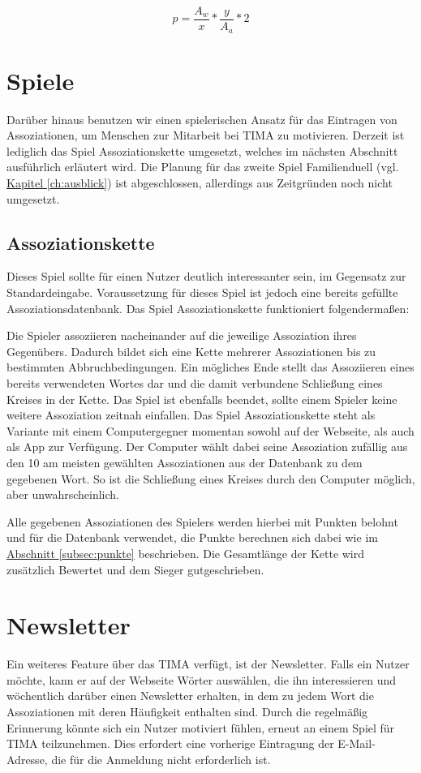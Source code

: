 \begin{equation}\label{eq:score}
p = \frac{A_w}{x} * \frac{y}{A_a} * 2
\end{equation}

\section{Spiele}\label{sec:games}
Darüber hinaus benutzen wir einen spielerischen Ansatz für das Eintragen von Assoziationen, um Menschen zur Mitarbeit bei TIMA zu motivieren. Derzeit ist lediglich das Spiel Assoziationskette umgesetzt, welches im nächsten Abschnitt ausführlich erläutert wird. Die Planung für das zweite Spiel Familienduell (vgl. \hyperref[ch:ausblick]{Kapitel \ref*{ch:ausblick}}) ist abgeschlossen, allerdings aus Zeitgründen noch nicht umgesetzt.

\subsection{Assoziationskette}
Dieses Spiel sollte für einen Nutzer deutlich interessanter sein, im Gegensatz zur Standardeingabe. Voraussetzung für dieses Spiel ist jedoch eine bereits gefüllte
Assoziationsdatenbank. Das Spiel Assoziationskette funktioniert folgendermaßen:

Die Spieler assoziieren nacheinander auf die jeweilige Assoziation ihres
Gegenübers. Dadurch bildet sich eine Kette mehrerer Assoziationen bis
zu bestimmten Abbruchbedingungen. Ein mögliches Ende stellt das Assoziieren
eines bereits verwendeten Wortes dar und die damit verbundene Schließung eines
Kreises in der Kette. Das Spiel ist ebenfalls beendet, sollte einem Spieler
keine weitere Assoziation zeitnah einfallen. Das Spiel Assoziationskette steht als Variante mit einem Computergegner
momentan sowohl auf der Webseite, als auch als App zur Verfügung. Der Computer
wählt dabei seine Assoziation zufällig aus den 10 am meisten gewählten
Assoziationen aus der Datenbank zu dem gegebenen Wort. So ist die Schließung eines Kreises durch den Computer möglich, aber unwahrscheinlich.

Alle gegebenen Assoziationen des Spielers werden hierbei mit Punkten belohnt
und für die Datenbank verwendet, die Punkte berechnen sich dabei wie im \hyperref[subsec:punkte]{Abschnitt \ref*{subsec:punkte}} beschrieben. Die Gesamtlänge der Kette wird zusätzlich Bewertet und dem Sieger gutgeschrieben.

\section{Newsletter}\label{subsec:newsletter}
Ein weiteres Feature über das TIMA verfügt, ist der Newsletter. Falls ein
Nutzer möchte, kann er auf der Webseite Wörter auswählen, die ihn
interessieren und wöchentlich darüber einen Newsletter erhalten, in dem zu
jedem Wort die Assoziationen mit deren Häufigkeit enthalten sind. Durch die
regelmäßig Erinnerung könnte sich ein Nutzer motiviert fühlen, erneut an einem
Spiel für TIMA teilzunehmen. Dies erfordert eine vorherige Eintragung der E-Mail-Adresse, die für die Anmeldung nicht erforderlich ist.

